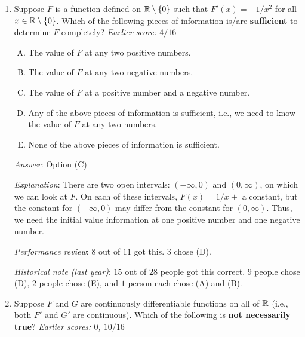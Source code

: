 \documentclass[10pt]{amsart}
\begin{document}
\begin{enumerate}
  {\em Historical note (last year)}: $10$ out of $28$ people got this
  correct. $6$ people chose (B), $5$ people chose (E), $4$ people
  chose (D), $2$ people chose (C), and $1$ person left the question
  blank.
\item Suppose $F$ is a function defined on $\mathbb{R} \setminus \{ 0 \}$ such
  that $F'(x) = -1/x^2$ for all $x \in \mathbb{R} \setminus \{ 0 \}$. Which of
  the following pieces of information is/are {\bf sufficient} to determine
  $F$ completely? {\em Earlier score: $4/16$}
  \begin{enumerate}[(A)]
  \item The value of $F$ at any two positive numbers.
  \item The value of $F$ at any two negative numbers.
  \item The value of $F$ at a positive number and a negative number.
  \item Any of the above pieces of information is sufficient, i.e., we
    need to know the value of $F$ at any two numbers.
  \item None of the above pieces of information is sufficient.
  \end{enumerate}

  {\em Answer}: Option (C)

  {\em Explanation}: There are two open intervals: $(-\infty,0)$ and
  $(0,\infty)$, on which we can look at $F$. On each of these
  intervals, $F(x) = 1/x + $ a constant, but the constant for
  $(-\infty,0)$ may differ from the constant for $(0,\infty)$. Thus,
  we need the initial value information at one positive number and one
  negative number.

  {\em Performance review}: $8$ out of $11$ got this. $3$ chose (D).

  {\em Historical note (last year)}: $15$ out of $28$ people got this
  correct. $9$ people chose (D), $2$ people chose (E), and $1$ person
  each chose (A) and (B).

\item Suppose $F$ and $G$ are continuously differentiable functions on
  all of $\mathbb{R}$ (i.e., both $F'$ and $G'$ are continuous). Which of the
  following is {\bf not necessarily true}? {\em Earlier scores: $0$,
  $10/16$}


\end{enumerate}
\end{document}
